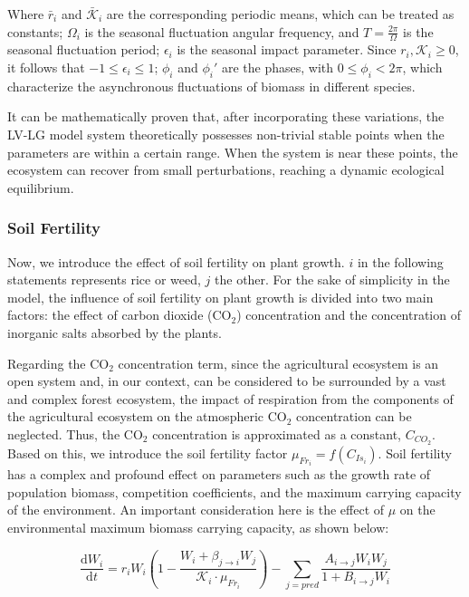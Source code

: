\documentclass{HZNUMCM}
\begin{document}
        Where $\bar{r}_i$ and $\bar{\mathscr{K}}_i$ are the corresponding periodic means, 
        which can be treated as constants; $\Omega_i$ is the seasonal fluctuation angular frequency, 
        and $T = \frac{2\pi}{\Omega}$ is the seasonal fluctuation period; 
        $\epsilon_i$ is the seasonal impact parameter. Since $r_i, \mathscr{K}_i \geqslant 0$, 
        it follows that $-1 \leqslant \epsilon_i \leqslant 1$; $\phi_i$ and $\phi_i'$ are the phases, 
        with $0 \leqslant \phi_i < 2\pi$, which characterize the asynchronous fluctuations of biomass in different species.

        It can be mathematically proven that, after incorporating these variations, 
        the LV-LG model system theoretically possesses non-trivial stable points when the parameters are within a certain range. 
        When the system is near these points, the ecosystem can recover from small perturbations, 
        reaching a dynamic ecological equilibrium.
      \subsubsection{Soil Fertility}
        Now, we introduce the effect of soil fertility on plant growth.
        $i$ in the following statements represents rice or weed, $j$ the other.
        For the sake of simplicity in the model, 
        the influence of soil fertility on plant growth is divided into two main factors: 
        the effect of carbon dioxide (CO$_2$) concentration and the concentration of inorganic salts absorbed by the plants.

        Regarding the CO$_2$ concentration term, 
        since the agricultural ecosystem is an open system and, 
        in our context, can be considered to be surrounded by a vast and complex forest ecosystem, 
        the impact of respiration from the components of the agricultural ecosystem on the atmospheric CO$_2$ concentration can be neglected. 
        Thus, the CO$_2$ concentration is approximated as a constant, \( C_{CO_2} \). 
        Based on this, we introduce the soil fertility factor \( \mu_{Fr_i} = f(C_{Is_i}) \). 
        Soil fertility has a complex and profound effect on parameters such as the growth rate of population biomass, 
        competition coefficients, and the maximum carrying capacity of the environment. 
        An important consideration here is the effect of \( \mu \) on the environmental maximum biomass carrying capacity, 
        as shown below:

        \[
        \frac{\mathrm{d}W_{i}}{\mathrm{d}t} = r_{i} W_{i} \left( 1 - \frac{W_{i} + \beta_{j \rightarrow i} W_{j}}{\mathscr{K}_{i} \cdot \mu_{Fr_i}} \right) - \sum_{j=pred}{\frac{A_{i\rightarrow j} W_{i} W_{j}}{1 + B_{i\rightarrow j} W_{i}}}
        \]
\end{document}
